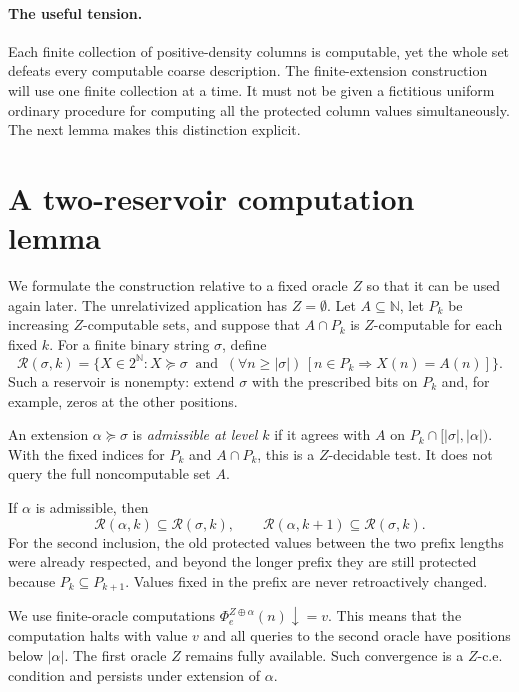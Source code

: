 \documentclass[11pt,a4paper]{article}
\newcommand{\N}{\mathbb N}
\newcommand{\Cantor}{2^{\N}}
\newcommand{\Res}{\mathcal R}
\theoremstyle{definition}
\theoremstyle{remark}
\begin{document}
\paragraph{The useful tension.}
Each finite collection of positive-density columns is computable, yet the
whole set defeats every computable coarse description. The finite-extension
construction will use one finite collection at a time. It must not be given
a fictitious uniform ordinary procedure for computing all the protected
column values simultaneously. The next lemma makes this distinction explicit.

\section{A two-reservoir computation lemma}\label{sec:reservoir}
We formulate the construction relative to a fixed oracle $Z$ so that it
can be used again later. The unrelativized application has $Z=\emptyset$.
Let $A\subseteq\N$, let $P_k$ be increasing $Z$-computable sets, and
suppose that $A\cap P_k$ is $Z$-computable for each fixed $k$.
For a finite binary string $\sigma$, define
\begin{equation}\label{eq:reservoir}
 \Res(\sigma,k)=\{X\in\Cantor:X\succeq\sigma\ \text{ and }\
  (\forall n\ge|\sigma|)\,[n\in P_k\Rightarrow X(n)=A(n)]\}.
\end{equation}
Such a reservoir is nonempty: extend $\sigma$ with the prescribed bits on
$P_k$ and, for example, zeros at the other positions.

An extension $\alpha\succeq\sigma$ is \emph{admissible at level $k$} if
it agrees with $A$ on $P_k\cap[|\sigma|,|\alpha|)$. With the fixed
indices for $P_k$ and $A\cap P_k$, this is a $Z$-decidable test.
It does not query the full noncomputable set $A$.

If $\alpha$ is admissible, then
\begin{equation}\label{eq:shrink}
 \Res(\alpha,k)\subseteq\Res(\sigma,k),\qquad
 \Res(\alpha,k+1)\subseteq\Res(\sigma,k).
\end{equation}
For the second inclusion, the old protected values between the two prefix
lengths were already respected, and beyond the longer prefix they are
still protected because $P_k\subseteq P_{k+1}$. Values fixed in the prefix
are never retroactively changed.

We use finite-oracle computations $\Phi_e^{Z\oplus\alpha}(n)\downarrow=v$.
This means that the computation halts with value $v$ and all queries to the
second oracle have positions below $|\alpha|$. The first oracle $Z$ remains
fully available. Such convergence is a $Z$-c.e. condition and persists
under extension of $\alpha$.
\end{document}
